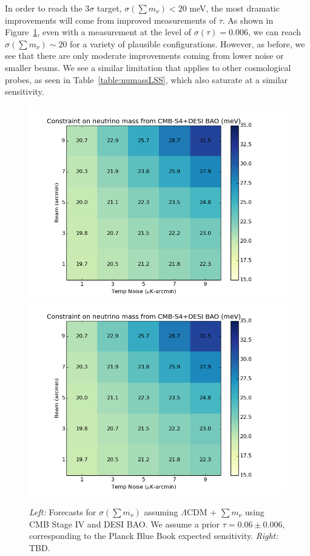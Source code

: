 In order to reach the 3$\sigma$ target, $\sigma(\sum m_\nu) < 20$ meV, the most dramatic improvements will come from improved measurements of $\tau$.  As shown in Figure~\ref{fig:mnu_tau}, even with a measurement at the level of $\sigma(\tau) = 0.006$, we can reach $\sigma(\sum m_\nu) \sim 20$ for a variety of plausible configurations.  However, as before, we see that there are only moderate improvements coming from lower noise or smaller beams.  We see a similar limitation that applies to other cosmological probes, as seen in Table~\ref{table:numassLSS}, which also saturate at a similar sensitivity.


\begin{figure}[h!]
\begin{center}
\includegraphics[scale=0.4]{Neutrinos/S4+DESI_BeamVsNoise_tauprior.png} \hspace{0.025cm}
\includegraphics[scale=0.4]{Neutrinos/S4+DESI_BeamVsNoise_tauprior.png}

\caption{ {\it Left:} Forecasts for $\sigma(\sum m_\nu)$ assuming $\Lambda$CDM + $\sum m_\nu$ using CMB Stage IV and DESI BAO.  We assume a prior $\tau = 0.06 \pm 0.006$, corresponding to the Planck Blue Book expected sensitivity. {\it Right:} TBD.  }
\label{fig:mnu_tau}
\end{center}
\end{figure} 

